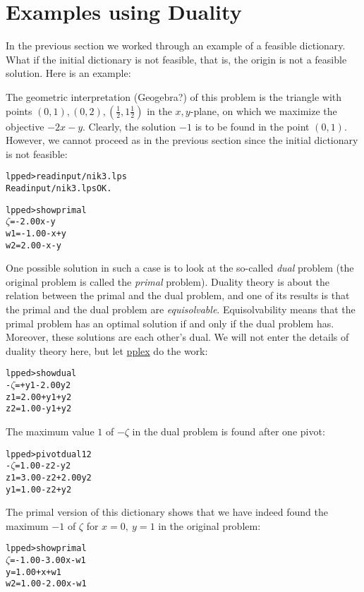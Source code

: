 \documentclass[ukenglish]{nik}
\begin{document}
\section{Examples using Duality}
In the previous section we worked through an example of a feasible dictionary.
What if the initial dictionary is not feasible, that is, the origin is not a
feasible solution. Here is an example:
\begin{alltt}

\end{alltt}
The geometric interpretation (Geogebra?) of this problem is the
triangle with points $(0,1),(0,2),(\frac{1}{2},1\frac{1}{2})$
in the $x,y$-plane, on which we maximize the objective $-2x-y$.
Clearly, the solution $-1$ is to be found in the point $(0,1)$.
However, we cannot proceed as in the previous section since the
initial dictionary is not feasible:
\begin{alltt}
lpped> read input/nik3.lps
Read input/nik3.lps OK.

lpped> show primal
 \(\zeta\) =        - 2.00x - y
w1 = - 1.00 -     x + y
w2 =   2.00 -     x - y
\end{alltt}
One possible solution in such a case is to look at the so-called
\emph{dual} problem (the original problem is called the \emph{primal} problem).
Duality theory is about the relation between the primal and the dual problem,
and one of its results is that the primal and the dual problem are \emph{equisolvable}.
Equisolvability means that the primal problem has an optimal solution if and only if 
the dual problem has. Moreover, these solutions are each other's dual.
We will not enter the details of duality theory here, but let \url{pplex} do the work:
\begin{alltt}
lpped> show dual
-\(\zeta\) =      + y1 - 2.00y2
z1 = 2.00 + y1 +     y2
z2 = 1.00 - y1 +     y2
\end{alltt}
The maximum value $1$ of \(-\zeta\) in the dual problem is found after one pivot:
\begin{alltt}
lpped> pivot dual 1 2
-\(\zeta\) = 1.00 - z2 -     y2
z1 = 3.00 - z2 + 2.00y2
y1 = 1.00 - z2 +     y2
\end{alltt}
The primal version of this dictionary shows that we have indeed found the
maximum $-1$ of $\zeta$ for $x=0,~y=1$ in the original problem:
\begin{alltt}
lpped> show primal
 \(\zeta\) = - 1.00 - 3.00x - w1
 y =   1.00 +     x + w1
w2 =   1.00 - 2.00x - w1
\end{alltt}
\end{document}
